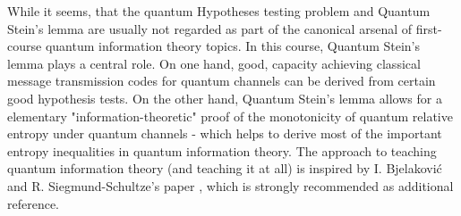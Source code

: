 While it seems, that the quantum Hypotheses testing problem and Quantum Stein's lemma are usually not regarded as part of the canonical arsenal of first-course quantum information theory topics. In this course, Quantum Stein's lemma plays a central role. On one hand, good, capacity achieving classical message transmission codes for quantum channels can be derived from certain good hypothesis tests. On the other hand, Quantum Stein's lemma allows for a elementary "information-theoretic" proof of the monotonicity of quantum relative entropy under quantum channels - which helps to derive most of the important entropy inequalities in quantum information theory. \newline 
The approach to teaching quantum information theory (and teaching it at all) is inspired by I. Bjelakovi\'c and R. Siegmund-Schultze's paper \cite{bjelakovic12a}, which is strongly recommended as additional reference.













